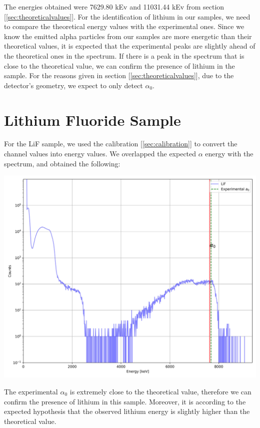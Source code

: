 \documentclass{article}
\begin{document}
\begin{multicols}{2}
The energies obtained were 7629.80 kEv and 11031.44 kEv from section [\ref{sec:theoreticalvalues}].
For the identification of lithium in our samples, we need to compare the theoretical energy values with the experimental ones.
Since we know the emitted alpha particles from our samples are more energetic than their theoretical values, it is expected that the experimental peaks are slightly ahead of the theoretical ones in the spectrum.
If there is a peak in the spectrum that is close to the theoretical value, we can confirm the presence of lithium in the sample.
For the reasons given in section [\ref{sec:theoreticalvalues}], due to the detector's geometry, we expect to only detect $\alpha_0$.

\section{Lithium Fluoride Sample}
    \label{sec:lif}

For the LiF sample, we used the calibration [\ref{sec:calibration}] to convert the channel values into energy values.
We overlapped the expected $\alpha$ energy with the spectrum, and obtained the following:

\begin{center}
    \centering
    \includegraphics[scale = 0.3]{../../images/OverlapLiF_NC.jpeg}
\end{center}

The experimental $\alpha_0$ is extremely close to the theoretical value, therefore we can confirm the presence of lithium in this sample.
Moreover, it is according to the expected hypothesis that the observed lithium energy is slightly higher than the theoretical value.


\end{multicols}
\end{document}
